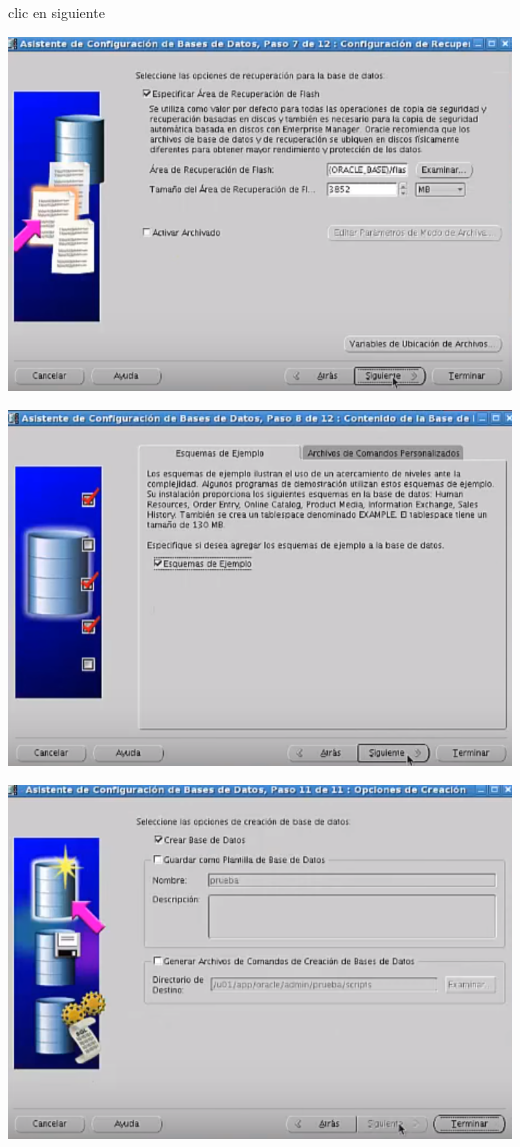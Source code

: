 \documentclass[12pt,letterpaper]{article}
\begin{document}
clic en siguiente \\
\begin{center}
	\includegraphics[width=15cm]{oraclelinux/41.png}
\end{center}
\begin{center}
	\includegraphics[width=15cm]{oraclelinux/42.png}
\end{center}
\begin{center}
	\includegraphics[width=15cm]{oraclelinux/43.png}
\end{center}
\end{document}
